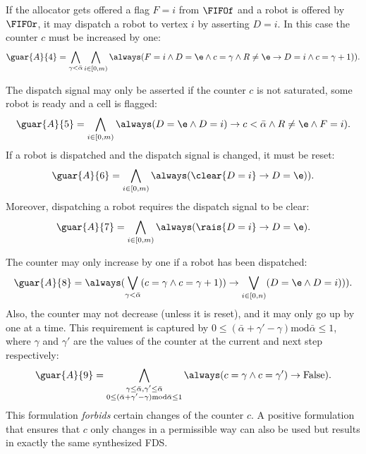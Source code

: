 If the allocator gets offered a flag $F = i$ from $\FIFOf$ and a robot is offered by $\FIFOr$, it may dispatch a robot to vertex $i$ by asserting $D = i$. In this case the counter $c$ must be increased by one:
\begin{equation*}
    \guar{A}{4} = \bigwedge_{\gamma < \bar{\alpha}} \bigwedge_{i \in [0,m)} \always (F=i \wedge D=\e \wedge c=\gamma \wedge R\neq \e \rightarrow \next(D=i \wedge c=\gamma+1)).
\end{equation*}

The dispatch signal may only be asserted if the counter $c$ is not saturated, some robot is ready and a cell is flagged:
\begin{equation*}
    \guar{A}{5} = \bigwedge_{i \in [0, m)} \always(D=\e \wedge \next(D=i) \rightarrow c<\bar{\alpha} \wedge R\neq\e \wedge F=i).
\end{equation*}
If a robot is dispatched and the dispatch signal is changed, it must be reset:
\begin{equation*}
    \guar{A}{6} = \bigwedge_{i \in [0, m)} \always(\clear{D=i} \rightarrow \next(D=\e)).
\end{equation*}
Moreover, dispatching a robot requires the dispatch signal to be clear:
\begin{equation*}
    \guar{A}{7} = \bigwedge_{i \in [0, m)} \always(\rais{D=i} \rightarrow D=\e).
\end{equation*}

The counter may only increase by one if a robot has been dispatched:
\begin{equation*}
    \guar{A}{8} = \always(\bigvee_{\gamma < \bar{\alpha}} (c=\gamma \wedge \next(c=\gamma+1)) \rightarrow \bigvee_{i \in [0, n)} (D=\e \wedge \next(D=i))).
\end{equation*}
Also, the counter may not decrease (unless it is reset), and it may only go up by one at a time. This requirement is captured by $0 \leq (\bar{\alpha} + \gamma' - \gamma) \mathrel\mathrm{mod} \bar{\alpha} \leq 1$, where $\gamma$ and $\gamma'$ are the values of the counter at the current and next step respectively:
\begin{equation*}
    \guar{A}{9} = \bigwedge_{\substack{\gamma \leq \bar{\alpha}, \gamma' \leq \bar{\alpha} \\ 0 \leq (\bar{\alpha} + \gamma' - \gamma) \mathrel\mathrm{mod} \bar{\alpha} \leq 1}} \always(c=\gamma \wedge \next(c=\gamma') \rightarrow \mathrm{False}).
\end{equation*}
This formulation \emph{forbids} certain changes of the counter $c$. A positive formulation that ensures that $c$ only changes in a permissible way can also be used but results in exactly the same synthesized FDS.\\

